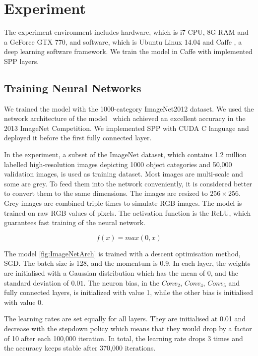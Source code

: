 
\chapter{Experiment} %
\label{Chapter4}

The experiment environment includes hardware, which is i7 CPU, 8G RAM and a GeForce GTX 770, and software, which is Ubuntu Linux 14.04 and Caffe \citep{jia2014caffe}, a deep learning software framework. We train the model in Caffe with implemented SPP layers.

\section{Training Neural Networks}

We trained the model with the 1000-category ImageNet2012 dataset. We used the network architecture of the model~\cite{ZeilerF13} which achieved an excellent accuracy in the 2013 ImageNet Competition. We implemented SPP with CUDA C language and deployed it before the first fully connected layer.

In the experiment, a subset of the ImageNet dataset, which contains 1.2 million labelled high-resolution images depicting 1000 object categories and 50,000 validation images, is used as training dataset. Most images are multi-scale and some are grey. To feed them into the network conveniently, it is considered better to convert them to the same dimensions. The images are resized to $256\times256$. Grey images are combined triple times to simulate RGB images. The model is trained on raw RGB values of pixels. The activation function is the ReLU, which guarantees fast training of the neural network.

\begin{equation}\label{eq:ReLU}
f(x) = max(0, x)
\end{equation}

The model \ref{fig:ImageNetArch} is trained with a descent optimisation method, SGD. The batch size is 128, and the momentum is 0.9.  In each layer, the weights are initialised with a Gaussian distribution which has the mean of $0$, and the standard deviation of $0.01$. The neuron bias, in the $Conv_{2}$, $Conv_{4}$, $Conv_{5}$ and fully connected layers, is initialized with value 1, while the other bias is initialised with value 0.

The learning rates are set equally for all layers. They are initialised at 0.01 and decrease with the stepdown policy which means that they would drop by a factor of 10 after each 100,000 iteration. In total, the learning rate drops 3 times and the accuracy keeps stable after 370,000 iterations. 

